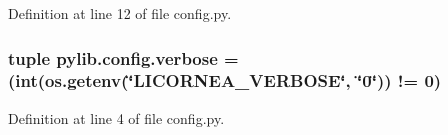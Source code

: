 Definition at line 12 of file config.\+py.

\subsubsection[{\texorpdfstring{verbose}{verbose}}]{\setlength{\rightskip}{0pt plus 5cm}tuple pylib.\+config.\+verbose = (int(os.\+getenv(\char`\"{}L\+I\+C\+O\+R\+N\+E\+A\+\_\+\+V\+E\+R\+B\+O\+SE\char`\"{}, \char`\"{}0\char`\"{})) != 0)}\hypertarget{namespacepylib_1_1config_a438cd472f53260ba54c02463f1d387ea}{}\label{namespacepylib_1_1config_a438cd472f53260ba54c02463f1d387ea}


Definition at line 4 of file config.\+py.

